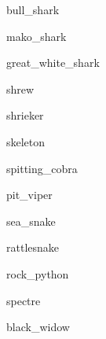 \documentclass[letterpaper,serif]{module}
\begin{document}

\begin{newmonster}{bull_shark}\end{newmonster}

\begin{newmonster}{mako_shark}\end{newmonster}

\begin{newmonster}{great_white_shark}\end{newmonster}

\begin{newmonster}{shrew}\end{newmonster}

\begin{newmonster}{shrieker}\end{newmonster}

\begin{newmonster}{skeleton}\end{newmonster}


\begin{newmonster}{spitting_cobra}\end{newmonster}

\begin{newmonster}{pit_viper}\end{newmonster}

\begin{newmonster}{sea_snake}\end{newmonster}

\begin{newmonster}{rattlesnake}\end{newmonster}

\begin{newmonster}{rock_python}\end{newmonster}

\begin{newmonster}{spectre}\end{newmonster}


\begin{newmonster}{black_widow}\end{newmonster}
\end{document}
